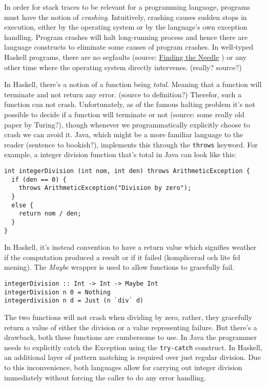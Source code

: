 In order for stack traces to be relevant for a programming language, programs
must have the notion of \emph{crashing}. Intuitively, crashing causes sudden
stops in execution, either by the operating system or by the language's own
exception handling. Program crashes will halt long-running process and hence
there are language constructs to eliminate some causes of program crashes.
In well-typed Haskell programs, there are no segfaults (source:
\href{http://research.microsoft.com/~simonpj/papers/stack-trace/DebugTraces.pdf}{Finding the Needle}
) or any other time where the operating system directly intervenes. (really? source?)

In Haskell, there's a notion of a function being \emph{total}. Meaning that a
function will terminate and not return any error. (source to definition?)
Therefor, such a function can not crash. Unfortunately, as of the famous
halting problem it's not possible to decide if a function will terminate or not
(source: some really old paper by Turing?), though whenever we programmatically
explicitly choose to crash we can avoid it. Java, which might be a more
familiar language to the reader (sentence to bookish?), implements this through the
\texttt{throws} keyword. For example, a integer division function that's total in
Java can look like this:

\begin{verbatim}
int integerDivision (int nom, int den) throws ArithmeticException {
  if (den == 0) {
    throws ArithmeticException("Division by zero");
  }
  else {
    return nom / den;
  }
}
\end{verbatim}

In Haskell, it's instead convention to have a return value which signifies
weather if the computation produced a result or if it failed (komplicerad och lite fel mening).
The \emph{Maybe}
wrapper is used to allow functions to gracefully fail.



\begin{verbatim}
integerDivision :: Int -> Int -> Maybe Int
integerDivision n 0 = Nothing
integerdivision n d = Just (n `div` d)
\end{verbatim}

The two functions will not crash when dividing by zero,
rather, they gracefully return a value of either the division or a
value representing failure. But there's a drawback, both
these functions are cumbersome to use. In Java the programmer needs to
explicitly catch the Exception using the \texttt{try-catch} construct.
In Haskell, an additional layer of pattern matching is required over
just regular division. Due to this inconvenience, both languages allow
for carrying out integer division immediately without forcing the caller
to do any error handling.

